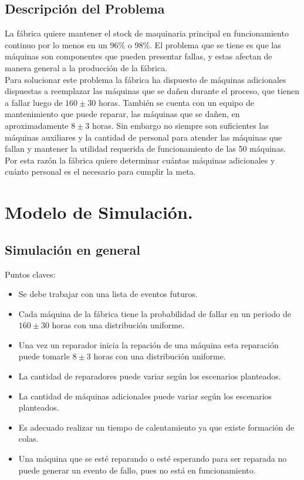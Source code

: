 \documentclass[12pt]{article}
\begin{document}
\subsection{Descripción del Problema}

La fábrica quiere mantener el stock de maquinaria principal en funcionamiento continuo por lo menos en un 96\% o 98\%. El problema que se tiene es que las máquinas son componentes que pueden presentar fallas, y estas afectan de manera general a la producción de la fábrica.\\

Para solucionar este problema la fábrica ha dispuesto de máquinas adicionales dispuestas a reemplazar las máquinas que se dañen durante el proceso, que tienen a fallar luego de $160\pm30$ horas. También se cuenta con un equipo de mantenimiento que puede reparar, las máquinas que se dañen, en aproximadamente $8\pm3$ horas. Sin embargo no siempre son suficientes las máquinas auxiliares y la cantidad de personal para atender las máquinas que fallan y mantener la utilidad requerida de funcionamiento de las 50 máquinas. Por esta razón la fábrica quiere determinar cuántas máquinas adicionales y cuánto personal es el necesario para cumplir la meta.

\section{Modelo de Simulación.}

\subsection{Simulación en general}

Puntos claves:
\begin{itemize}
\item Se debe trabajar con una lista de eventos futuros.
\item Cada máquina de la fábrica tiene la probabilidad de fallar en un periodo de $160\pm30$ horas con una distribución uniforme.
\item Una vez un reparador inicia la repación de una máquina esta reparación puede tomarle $8\pm3$ horas con una distribución uniforme.
\item La cantidad de reparadores puede variar según los escenarios planteados.
\item La cantidad de máquinas adicionales puede variar según los escenarios planteados.
\item Es adecuado realizar un tiempo de calentamiento ya que existe formación de colas.
\item Una máquina que se esté reparando o esté esperando para ser reparada no puede generar un evento de fallo, pues no está en funcionamiento. 
\end{itemize}
\end{document}
